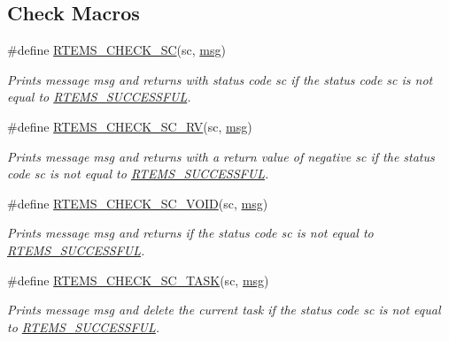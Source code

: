 \subsection*{Check Macros}
\begin{DoxyCompactItemize}
\item 
\#define \mbox{\hyperlink{group__rtems__status__checks_ga91728f4d49188964c0858580daf09650}{R\+T\+E\+M\+S\+\_\+\+C\+H\+E\+C\+K\+\_\+\+SC}}(sc,  \mbox{\hyperlink{structmsg}{msg}})
\begin{DoxyCompactList}\small\item\em Prints message {\itshape msg} and returns with status code {\itshape sc} if the status code {\itshape sc} is not equal to \mbox{\hyperlink{group__ClassicStatus_gga545d41846817eaba6143d52ee4d9e9fea8a23e2d94778f09399da984d73562536}{R\+T\+E\+M\+S\+\_\+\+S\+U\+C\+C\+E\+S\+S\+F\+UL}}. \end{DoxyCompactList}\item 
\#define \mbox{\hyperlink{group__rtems__status__checks_ga35f2f2630337ae4fbd3467a210c64885}{R\+T\+E\+M\+S\+\_\+\+C\+H\+E\+C\+K\+\_\+\+S\+C\+\_\+\+RV}}(sc,  \mbox{\hyperlink{structmsg}{msg}})
\begin{DoxyCompactList}\small\item\em Prints message {\itshape msg} and returns with a return value of negative {\itshape sc} if the status code {\itshape sc} is not equal to \mbox{\hyperlink{group__ClassicStatus_gga545d41846817eaba6143d52ee4d9e9fea8a23e2d94778f09399da984d73562536}{R\+T\+E\+M\+S\+\_\+\+S\+U\+C\+C\+E\+S\+S\+F\+UL}}. \end{DoxyCompactList}\item 
\#define \mbox{\hyperlink{group__rtems__status__checks_ga0ce95e0a68ab52ea6323e1a5ba3bead0}{R\+T\+E\+M\+S\+\_\+\+C\+H\+E\+C\+K\+\_\+\+S\+C\+\_\+\+V\+O\+ID}}(sc,  \mbox{\hyperlink{structmsg}{msg}})
\begin{DoxyCompactList}\small\item\em Prints message {\itshape msg} and returns if the status code {\itshape sc} is not equal to \mbox{\hyperlink{group__ClassicStatus_gga545d41846817eaba6143d52ee4d9e9fea8a23e2d94778f09399da984d73562536}{R\+T\+E\+M\+S\+\_\+\+S\+U\+C\+C\+E\+S\+S\+F\+UL}}. \end{DoxyCompactList}\item 
\#define \mbox{\hyperlink{group__rtems__status__checks_ga344fa496d2064e0435c875e8ee70e346}{R\+T\+E\+M\+S\+\_\+\+C\+H\+E\+C\+K\+\_\+\+S\+C\+\_\+\+T\+A\+SK}}(sc,  \mbox{\hyperlink{structmsg}{msg}})
\begin{DoxyCompactList}\small\item\em Prints message {\itshape msg} and delete the current task if the status code {\itshape sc} is not equal to \mbox{\hyperlink{group__ClassicStatus_gga545d41846817eaba6143d52ee4d9e9fea8a23e2d94778f09399da984d73562536}{R\+T\+E\+M\+S\+\_\+\+S\+U\+C\+C\+E\+S\+S\+F\+UL}}. \end{DoxyCompactList}\item 

\end{DoxyCompactItemize}
